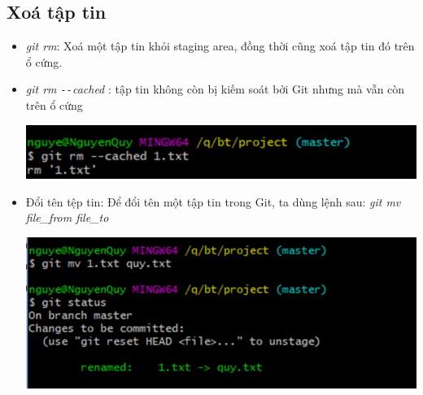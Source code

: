\documentclass[12pt,a4paper]{report}
\begin{document}
\subsection{Xoá tập tin} 
\begin{itemize}
\item {\it git rm}: Xoá một tập tin khỏi staging area, đồng thời cũng xoá tập tin đó trên ổ cứng.
\item {\it git rm \texttt{-{}-}cached} : tập tin không còn bị kiếm soát bởi Git nhưng mà vẫn còn trên ổ cứng


	\includegraphics[width=0.8\linewidth]{screenshot015}
	
	\label{fig:screenshot015}
\item Đổi tên tệp tin: Để đổi tên một tập tin trong Git, ta dùng lệnh sau: {\it git mv file\_from file\_to}

	\includegraphics[width=0.8\linewidth]{screenshot016}

	\label{fig:screenshot016}
\end{itemize}
	\newpage
\end{document}
